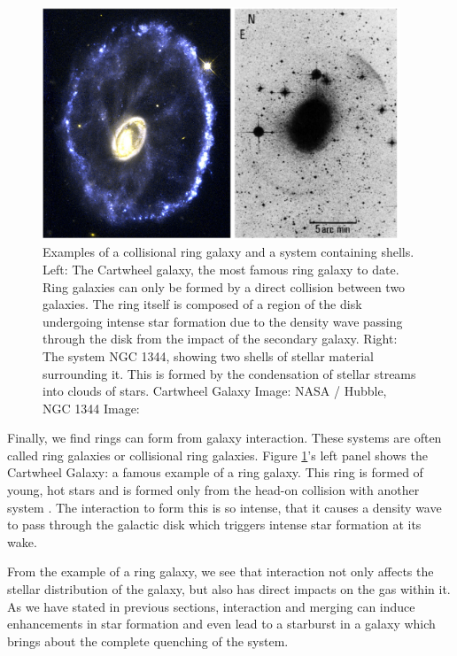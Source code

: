 \begin{figure}
\centering
\includegraphics[width=0.95\textwidth]{Introduction/figures/shells-rings.jpg}
\caption[Examples of a collisional ring galaxy and a system containing shells.]{Examples of a collisional ring galaxy and a system containing shells. Left: The Cartwheel galaxy, the most famous ring galaxy to date. Ring galaxies can only be formed by a direct collision between two galaxies. The ring itself is composed of a region of the disk undergoing intense star formation due to the density wave passing through the disk from the impact of the secondary galaxy. Right: The system NGC 1344, showing two shells of stellar material surrounding it. This is formed by the condensation of stellar streams into clouds of stars. Cartwheel Galaxy Image: NASA / Hubble, NGC 1344 Image: \citet{1983ApJ...274..534M}}
\label{fig:tidal-features-ex}
\end{figure}

Finally, we find rings can form from galaxy interaction. These systems are often called ring galaxies or collisional ring galaxies. Figure \ref{fig:tidal-features-ex}'s left panel shows the Cartwheel Galaxy: a famous example of a ring galaxy. This ring is formed of young, hot stars and is formed only from the head-on collision with another system \citep{1976ApJ...209..382L}. The interaction to form this is so intense, that it causes a density wave to pass through the galactic disk which triggers intense star formation at its wake.

From the example of a ring galaxy, we see that interaction not only affects the stellar distribution of the galaxy, but also has direct impacts on the gas within it. As we have stated in previous sections, interaction and merging can induce enhancements in star formation and even lead to a starburst in a galaxy which brings about the complete quenching of the system.

